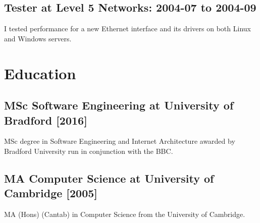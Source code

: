 \documentclass[10pt]{article}
\begin{document}
\subsection*{Tester at Level 5 Networks: 2004-07 to 2004-09}

I tested performance for a new Ethernet interface and its drivers on both Linux and Windows servers.




\section*{Education}



\subsection*{MSc Software Engineering at University of Bradford [2016]}

MSc degree
in Software Engineering and Internet Architecture awarded by Bradford University
run in conjunction with the BBC.



\subsection*{MA Computer Science at University of Cambridge [2005]}

MA (Hons) (Cantab) in Computer Science from the University of Cambridge.
\end{document}
